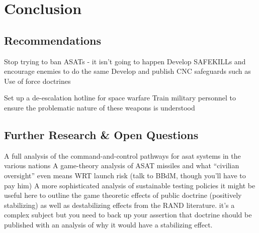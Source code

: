 \section{Conclusion}

\subsection{Recommendations}
Stop trying to ban ASATs - it isn't going to happen
Develop SAFEKILLs and encourage enemies to do the same
Develop and publish CNC safeguards such as
Use of force doctrines


Set up a de-escalation hotline for space warfare
Train military personnel to ensure the problematic nature of these weapons is understood

\subsection{Further Research \& Open Questions}
A full analysis of the command-and-control pathways for asat systems in the various nations
A game-theory analysis of ASAT missiles and what ``civilian oversight'' even means WRT launch risk (talk to BBdM, though you'll have to pay him)
A more sophisticated analysis of sustainable testing policies
it might be useful here to outline the game theoretic effects of public doctrine (positively stabilizing) as well as  destabilizing effects from the RAND literature. it's a complex subject but you need to back up your assertion that doctrine should be published with an analysis of why it would have a stabilizing effect.
